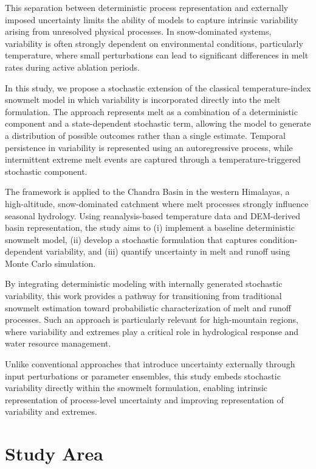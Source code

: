 \documentclass[11pt]{article}
\begin{document}
This separation between deterministic process representation and externally imposed uncertainty limits the ability of models to capture intrinsic variability arising from unresolved physical processes. In snow-dominated systems, variability is often strongly dependent on environmental conditions, particularly temperature, where small perturbations can lead to significant differences in melt rates during active ablation periods.

In this study, we propose a stochastic extension of the classical temperature-index snowmelt model in which variability is incorporated directly into the melt formulation. The approach represents melt as a combination of a deterministic component and a state-dependent stochastic term, allowing the model to generate a distribution of possible outcomes rather than a single estimate. Temporal persistence in variability is represented using an autoregressive process, while intermittent extreme melt events are captured through a temperature-triggered stochastic component.

The framework is applied to the Chandra Basin in the western Himalayas, a high-altitude, snow-dominated catchment where melt processes strongly influence seasonal hydrology. Using reanalysis-based temperature data and DEM-derived basin representation, the study aims to (i) implement a baseline deterministic snowmelt model, (ii) develop a stochastic formulation that captures condition-dependent variability, and (iii) quantify uncertainty in melt and runoff using Monte Carlo simulation.

By integrating deterministic modeling with internally generated stochastic variability, this work provides a pathway for transitioning from traditional snowmelt estimation toward probabilistic characterization of melt and runoff processes. Such an approach is particularly relevant for high-mountain regions, where variability and extremes play a critical role in hydrological response and water resource management. 

Unlike conventional approaches that introduce uncertainty externally through input perturbations or parameter ensembles, this study embeds stochastic variability directly within the snowmelt formulation, enabling intrinsic representation of process-level uncertainty and improving representation of variability and extremes.
	
\section{Study Area}
\end{document}
